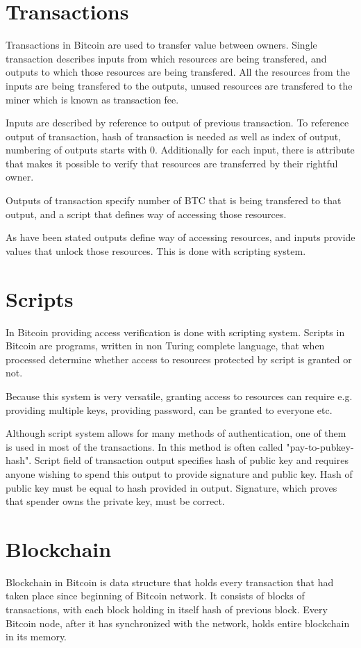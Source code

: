 \documentclass[12pt, en, eng, oneside]{mgr}
\begin{document}
\section{Transactions}
Transactions in Bitcoin are used to transfer value between owners. Single transaction describes inputs from which resources are being transfered, and outputs to which those resources are being transfered. All the resources from the inputs are being transfered to the outputs, unused resources are transfered to the miner which is known as transaction fee.

Inputs are described by reference to output of previous transaction. To reference output of transaction, hash of transaction is needed as well as index of output, numbering of outputs starts with 0. Additionally for each input, there is attribute that makes it possible to verify that resources are transferred by their rightful owner. \cite{bitcoin-transaction}

Outputs of transaction specify number of BTC that is being transfered to that output, and a script that defines way of accessing those resources. 

As have been stated outputs define way of accessing resources, and inputs provide values that unlock those resources. This is done with scripting system.

\section{Scripts}
In Bitcoin providing access verification is done with scripting system. Scripts in Bitcoin are programs, written in non Turing complete language, that when processed determine whether access to resources protected by script is granted or not. \cite{bitcoin-script}

Because this system is very versatile, granting access to resources can require e.g. providing multiple keys, providing password, can be granted to everyone etc. 

Although script system allows for many methods of authentication, one of them is used in most of the transactions. In this method is often called "pay-to-pubkey-hash". Script field of transaction output specifies hash of public key and requires anyone wishing to spend this output to provide signature and public key. Hash of public key must be equal to hash provided in output. Signature, which proves that spender owns the private key, must be correct.


\section{Blockchain}
Blockchain in Bitcoin is data structure that holds every transaction that had taken place since beginning of Bitcoin network. It consists of blocks of transactions, with each block holding in itself hash of previous block. Every Bitcoin node, after it has synchronized with the network, holds entire blockchain in its memory.
\end{document}
